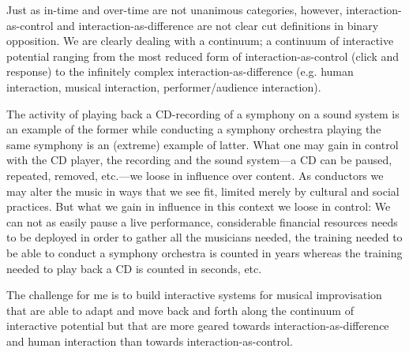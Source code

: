 \documentclass{article}
\begin{document}

Just as in-time and over-time are not unanimous categories, however, interaction-as-control and interaction-as-difference are not clear cut definitions in binary opposition. We are clearly dealing with a continuum; a continuum of interactive potential ranging from the most reduced form of interaction-as-control (click and response) to the infinitely complex interaction-as-difference (e.g. human interaction, musical interaction, performer/audience interaction). 

The activity of playing back a CD-recording of a symphony on a sound system is an example of the former while conducting a symphony orchestra playing the same symphony is an (extreme) example of latter. What one may gain in control with the CD player, the recording and the sound system---a CD can be paused, repeated, removed, etc.---we loose in influence over content. 
As conductors we may alter the music in ways that we see fit, limited merely by cultural and social practices. But what we gain in influence in this context we loose in control: We can not as easily pause a live performance, considerable financial resources needs to be deployed in order to gather all the musicians needed, the training needed to be able to conduct a symphony orchestra is counted in years whereas the training needed to play back a CD is counted in seconds, etc. 

The challenge for me is to build interactive systems for musical improvisation that are able to adapt and move back and forth along the continuum of interactive potential but that are more geared towards interaction-as-difference and human interaction than towards interaction-as-control.


\end{document}
